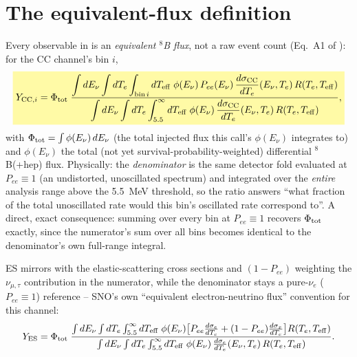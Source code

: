 \section{The equivalent-flux definition}
\label{sec:equivalent-flux}


\begin{theorybox}
Every observable in  is an \emph{equivalent
$^8$B flux}, not a raw event count (Eq.~A1 of \cite{Aharmim2005SaltPhase}):
for the CC channel's bin $i$,
\begin{equation}
  \keyresult{Y_{{\rm CC},i} = \Phi_{\rm tot}\;
    \frac{\displaystyle\int dE_\nu\int dT_e\int_{{\rm bin}\,i} dT_{\rm eff}\;
      \phi(E_\nu)\,P_{ee}(E_\nu)\,\frac{d\sigma_{\rm CC}}{dT_e}(E_\nu,T_e)\,R(T_e,T_{\rm eff})}
    {\displaystyle\int dE_\nu\int dT_e\int_{5.5}^{\infty} dT_{\rm eff}\;
      \phi(E_\nu)\,\frac{d\sigma_{\rm CC}}{dT_e}(E_\nu,T_e)\,R(T_e,T_{\rm eff})},}
  \label{eq:cc-equivalent-flux}
\end{equation}
with $\Phi_{\rm tot}=\int\phi(E_\nu)\,dE_\nu$ (the total injected flux this
call's $\phi(E_\nu)$ integrates to) and $\phi(E_\nu)$ the total (not yet
survival-probability-weighted) differential $^8$B(+hep) flux. Physically:
the \emph{denominator} is the same detector fold evaluated at
$P_{ee}\equiv1$ (an undistorted, unoscillated spectrum) and integrated over
the \emph{entire} analysis range above the 5.5~MeV threshold, so the ratio
answers ``what fraction of the total unoscillated rate would this bin's
oscillated rate correspond to''. A direct, exact consequence: summing
 over every bin at $P_{ee}\equiv1$ recovers
$\Phi_{\rm tot}$ exactly, since the numerator's sum over all bins becomes
identical to the denominator's own full-range integral.

ES mirrors  with the elastic-scattering
cross sections and $(1-P_{ee})$ weighting the $\nu_{\mu,\tau}$ contribution
in the numerator, while the denominator stays a pure-$\nu_e$ ($P_{ee}\equiv1$)
reference -- SNO's own ``equivalent electron-neutrino flux'' convention for
this channel:
\begin{equation}
  Y_{\rm ES} = \Phi_{\rm tot}\;
    \frac{\int dE_\nu\int dT_e\int_{5.5}^{\infty} dT_{\rm eff}\;\phi(E_\nu)
      \bigl[P_{ee}\frac{d\sigma_e}{dT_e}+(1-P_{ee})\frac{d\sigma_x}{dT_e}\bigr]R(T_e,T_{\rm eff})}
    {\int dE_\nu\int dT_e\int_{5.5}^{\infty} dT_{\rm eff}\;\phi(E_\nu)\,
      \frac{d\sigma_e}{dT_e}(E_\nu,T_e)\,R(T_e,T_{\rm eff})}.
  \label{eq:es-equivalent-flux}
\end{equation}


\end{theorybox}
